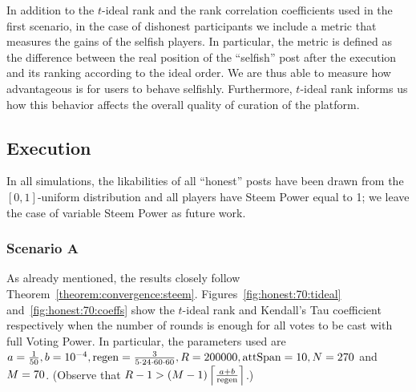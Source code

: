 %
    In addition to the $t$-ideal rank and the rank correlation coefficients used
    in the first scenario, in the case of dishonest participants we include a
    metric that measures the gains of the selfish players. In particular, the
    metric is defined as the difference between the real position of the
    ``selfish'' post after the execution and its ranking according to the ideal
    order. We are thus able to measure how advantageous is for users to behave
    selfishly. Furthermore, $t$-ideal rank informs us how this behavior affects
    the overall quality of curation of the platform.

  \subsection{Execution}
    In all simulations, the likabilities of all ``honest'' posts have been drawn
    from the $\left[0, 1\right]$-uniform distribution and all players have Steem
    Power equal to 1; we leave the case of variable Steem Power as future work.

    \subsubsection*{Scenario A}
      As already mentioned, the results closely follow
      Theorem~\ref{theorem:convergence:steem}.
      Figures~\ref{fig:honest:70:tideal} and~\ref{fig:honest:70:coeffs} show the
      $t$-ideal rank and Kendall's Tau coefficient respectively when the number
      of rounds is enough for all votes to be cast with full Voting Power. In
      particular, the parameters used are $a = \frac{1}{50}, b = 10^{-4}, \regen
      = \frac{3}{5 \cdot 24 \cdot 60 \cdot 60}, \rounds = 200000, \attspan = 10,
      \playerlen = 270$ and $\postlen = 70$. (Observe that $\rounds - 1 >
      \left(\postlen - 1\right)\ceil*{\frac{a + b}{\regen}}$.)

